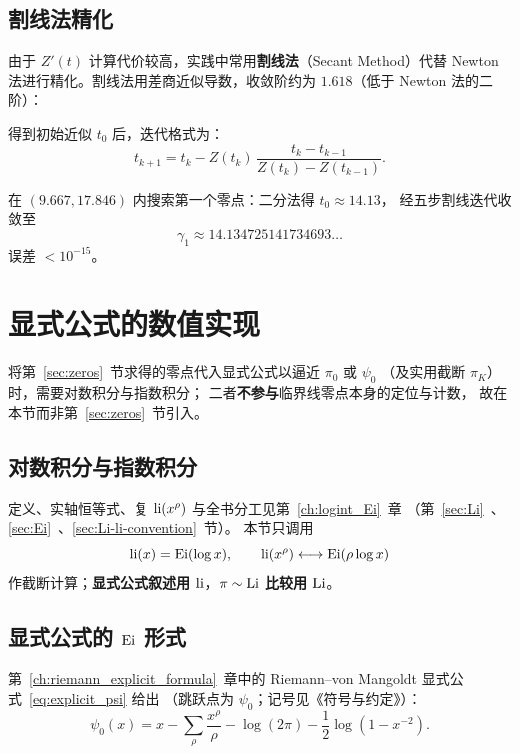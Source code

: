 \subsection{割线法精化}

由于 $Z'(t)$ 计算代价较高，实践中常用\textbf{割线法}（Secant Method）代替 Newton 法进行精化。割线法用差商近似导数，收敛阶约为 $1.618$（低于 Newton 法的二阶）：

得到初始近似 $t_0$ 后，迭代格式为：
\begin{equation}
  t_{k+1} = t_k - Z(t_k)\,\frac{t_k-t_{k-1}}{Z(t_k)-Z(t_{k-1})}.
  \label{eq:secant}
\end{equation}

\begin{example}{}{}
在 $(9.667,17.846)$ 内搜索第一个零点：二分法得 $t_0\approx14.13$，
经五步割线迭代收敛至
\[
\gamma_1 \approx 14.134725141734693\ldots
\]
误差 $<10^{-15}$。
\end{example}

\section{显式公式的数值实现}\label{sec:explicit}

将第~\ref{sec:zeros}~节求得的零点代入显式公式以逼近 $\pi_0$ 或 $\psi_0$
（及实用截断 $\pi_K$）时，需要对数积分与指数积分；
二者\textbf{不参与}临界线零点本身的定位与计数，
故在本节而非第~\ref{sec:zeros}~节引入。

\subsection{对数积分与指数积分}

定义、实轴恒等式、复 $\operatorname{li}(x^{\rho})$ 与全书分工见第~\ref{ch:logint_Ei}~章
（第~\ref{sec:Li}~、\ref{sec:Ei}~、\ref{sec:Li-li-convention}~节）。
本节只调用
\[
  \operatorname{li}(x)=\operatorname{Ei}(\log x),\qquad
  \operatorname{li}(x^{\rho})\longleftrightarrow\operatorname{Ei}(\rho\log x)
\]
作截断计算；\textbf{显式公式叙述用 $\operatorname{li}$}，\textbf{$\pi\sim\operatorname{Li}$ 比较用 $\operatorname{Li}$}。

\subsection{显式公式的 \texorpdfstring{$\operatorname{Ei}$}{Ei} 形式}

第~\ref{ch:riemann_explicit_formula}~章中的 Riemann--von Mangoldt 显式公式~\eqref{eq:explicit_psi} 给出
（跳跃点为 $\psi_0$；记号见《符号与约定》）：
\[
\psi_0(x) = x - \sum_{\rho} \frac{x^{\rho}}{\rho} - \log(2\pi) - \frac12\log(1-x^{-2}).
\]

